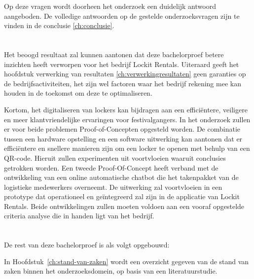 
Op deze vragen wordt doorheen het onderzoek een duidelijk antwoord aangeboden. De volledige antwoorden op de gestelde onderzoeksvragen zijn te vinden in de conclusie \ref{ch:conclusie}.
\newpage


\section{}%
\label{sec:onderzoeksdoelstelling}
Het beoogd resultaat zal kunnen aantonen dat deze bachelorproef betere inzichten heeft verworpen voor het bedrijf Lockit Rentals. Uiteraard geeft het hoofdstuk verwerking van resultaten \ref{ch:verwerkingresultaten} geen garanties op de bedrijfsactiviteiten, het zijn wel factoren waar het bedrijf rekening mee kan houden in de toekomst om deze te optimaliseren.

Kortom, het digitaliseren van lockers kan bijdragen aan een efficiëntere, veiligere en meer klantvriendelijke ervaringen voor festivalgangers. In het onderzoek zullen er voor beide problemen Proof-of-Concepten opgesteld worden. De combinatie tussen een hardware opstelling en een software uitwerking kan aantonen dat er efficiëntere en snellere manieren zijn om een locker te openen met behulp van een QR-code. Hieruit zullen experimenten uit voortvloeien waaruit conclusies getrokken worden. Een tweede Proof-Of-Concept heeft verband met de ontwikkeling van een online automatische chatbot die het takenpakket van de logistieke medewerkers overneemt. De uitwerking zal voortvloeien in een prototype dat operationeel en geïntegreerd zal zijn in de applicatie van Lockit Rentals. Beide ontwikkelingen zullen moeten voldoen aan een vooraf opgestelde criteria analyse die in handen ligt van het bedrijf. 


\section{}%
\label{sec:opzet-bachelorproef}

De rest van deze bachelorproef is als volgt opgebouwd:

In Hoofdstuk~\ref{ch:stand-van-zaken} wordt een overzicht gegeven van de stand van zaken binnen het onderzoeksdomein, op basis van een literatuurstudie.

